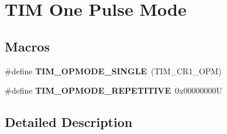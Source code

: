 \hypertarget{group___t_i_m___one___pulse___mode}{}\section{T\+IM One Pulse Mode}
\label{group___t_i_m___one___pulse___mode}
\subsection*{Macros}
\begin{DoxyCompactItemize}
\item 
\mbox{\label{group___t_i_m___one___pulse___mode_gab0447b341024e86145c7ce0dc2931fc6}} 
\#define {\bfseries T\+I\+M\+\_\+\+O\+P\+M\+O\+D\+E\+\_\+\+S\+I\+N\+G\+LE}~(T\+I\+M\+\_\+\+C\+R1\+\_\+\+O\+PM)
\item 
\mbox{\label{group___t_i_m___one___pulse___mode_ga14a7b6f95769c5b430f65189d9c7cfa3}} 
\#define {\bfseries T\+I\+M\+\_\+\+O\+P\+M\+O\+D\+E\+\_\+\+R\+E\+P\+E\+T\+I\+T\+I\+VE}~0x00000000U
\end{DoxyCompactItemize}


\subsection{Detailed Description}
